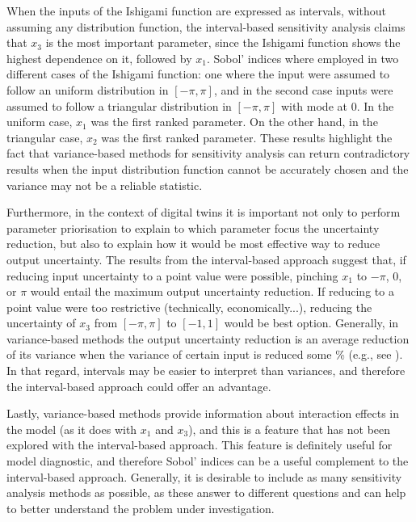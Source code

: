 \documentclass[twocolumn]{rps-esrel2022}
\begin{document}
When the inputs of the Ishigami function are expressed as intervals, without assuming any distribution function,
the interval-based sensitivity analysis claims that $x_3$ is the most important parameter, since the Ishigami function
shows the highest dependence on it, followed by $x_1$.
Sobol' indices where employed in two different cases of the Ishigami function: one where the input were assumed to follow
an uniform distribution in $[-\pi,\pi]$, and in the second case inputs were assumed to follow a triangular distribution
in $[-\pi,\pi]$ with mode at $0$.
In the uniform case, $x_1$ was the first ranked parameter.
On the other hand, in the triangular case, $x_2$ was the first ranked parameter.
These results highlight the fact that variance-based methods for sensitivity analysis can return contradictory results
when the input distribution function cannot be accurately chosen and the variance may not be a reliable statistic.

Furthermore, in the context of digital twins it is important not only to perform parameter priorisation to explain to which
parameter focus the uncertainty reduction, but also to explain how it would be most effective way to reduce output uncertainty.
The results from the interval-based approach suggest that, if reducing input uncertainty to a point value were possible, pinching
$x_1$ to $-\pi$, $0$, or $\pi$ would entail the maximum output uncertainty reduction.
If reducing to a point value were too restrictive (technically, economically...), reducing the uncertainty of $x_3$ from $[-\pi,\pi]$
to $[-1,1]$ would be best option.
Generally, in variance-based methods the output uncertainty reduction is an average reduction of its variance when the variance of certain input
is reduced some \% (e.g., see \cite{allaire2012variance}).
In that regard, intervals may be easier to interpret than variances, and therefore the interval-based approach could offer
an advantage.

Lastly, variance-based methods provide information about interaction effects in the model (as it does with $x_1$ and $x_3$),
and this is a feature that has not been explored with the interval-based approach.
This feature is definitely useful for model diagnostic, and therefore Sobol' indices can be a useful complement to the
interval-based approach.
Generally, it is desirable to include as many sensitivity analysis methods as possible, as these answer to different questions
and can help to better understand the problem under investigation.
\end{document}
